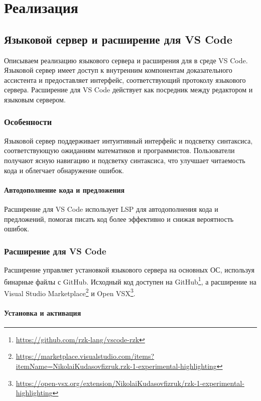 \chapter{Реализация}
\label{chap:impl}

\section{Языковой сервер \Rzk{} и расширение для VS Code}

Описываем реализацию языкового сервера и расширения для \Rzk{} в среде VS Code. Языковой сервер имеет доступ к внутренним компонентам доказательного ассистента и предоставляет интерфейс, соответствующий протоколу языкового сервера. Расширение для VS Code действует как посредник между редактором и языковым сервером.

\subsection{Особенности}

Языковой сервер поддерживает интуитивный интерфейс и подсветку синтаксиса, соответствующую ожиданиям математиков и программистов. Пользователи получают ясную навигацию и подсветку синтаксиса, что улучшает читаемость кода и облегчает обнаружение ошибок.

\subsubsection{Автодополнение кода и предложения}

Расширение для VS Code \Rzk{} использует LSP для автодополнения кода и предложений, помогая писать код более эффективно и снижая вероятность ошибок.

\subsection{Расширение для VS Code}

Расширение управляет установкой языкового сервера на основных ОС, используя бинарные файлы с GitHub. Исходный код доступен на GitHub\footnote{\url{https://github.com/rzk-lang/vscode-rzk}}, а расширение на Visual Studio Marketplace\footnote{\url{https://marketplace.visualstudio.com/items?itemName=NikolaiKudasovfizruk.rzk-1-experimental-highlighting}} и Open VSX\footnote{\url{https://open-vsx.org/extension/NikolaiKudasovfizruk/rzk-1-experimental-highlighting}}.

\subsubsection{Установка и активация}

